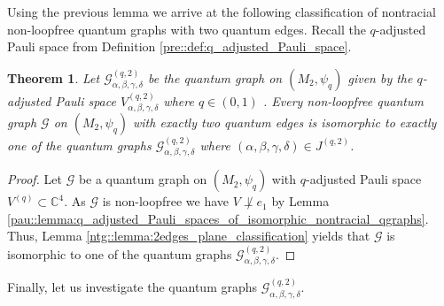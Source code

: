 \documentclass{amsart}
\newtheorem{thm}{Theorem}[section]
\newcommand{\C}{\mathbb{C}}
\DeclareMathOperator{\spann}{span}
\begin{document}
Using the previous lemma we arrive at the following classification of nontracial non-loopfree quantum graphs with two quantum edges. Recall the $q$-adjusted Pauli space from Definition \ref{pre::def:q_adjusted_Pauli_space}.

\begin{thm}
    \label{ntg::thm:classification_of_nontracial_qgraphs_with_two_edges}
    Let $\mathcal{G}_{\alpha, \beta, \gamma, \delta}^{(q,2)}$ be the quantum graph on $(M_2, \psi_q)$ given by the $q$-adjusted Pauli space $V_{\alpha, \beta, \gamma, \delta}^{(q,2)}$ where $q \in (0,1)$ .
    Every non-loopfree quantum graph $\mathcal{G}$ on $(M_2, \psi_q)$ with exactly two quantum edges is isomorphic to exactly one of the quantum graphs $\mathcal{G}_{\alpha, \beta, \gamma, \delta}^{(q,2)}$ where  $(\alpha,\beta, \gamma, \delta) \in J^{(q,2)}$.
\end{thm}

\begin{proof}
    Let $\mathcal{G}$ be a quantum graph on $(M_2, \psi_q)$ with $q$-adjusted Pauli space $V^{(q)} \subset \C^4$. As $\mathcal{G}$ is non-loopfree we have $V \not \perp e_1$ by Lemma \ref{pau::lemma:q_adjusted_Pauli_spaces_of_isomorphic_nontracial_qgraphs}. Thus, Lemma \ref{ntg::lemma:2edges_plane_classification} yields that $\mathcal{G}$ is isomorphic to one of the quantum graphs $\mathcal{G}_{\alpha, \beta, \gamma, \delta}^{(q,2)}$.
\end{proof}


Finally, let us investigate the quantum graphs $\mathcal{G}_{\alpha, \beta, \gamma, \delta}^{(q,2)}$.
\end{document}
